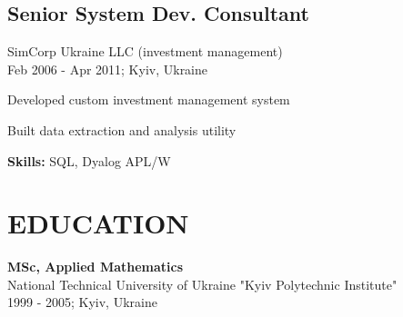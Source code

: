 \documentclass[a4paper,10pt]{article}
\begin{document}
\subsection*{Senior System Dev. Consultant}
SimCorp Ukraine LLC (investment management) \\
Feb 2006 - Apr 2011; Kyiv, Ukraine
\begin{bulletlist}
    \item Developed custom investment management system
    \item Built data extraction and analysis utility
\end{bulletlist}
\textbf{Skills:} SQL, Dyalog APL/W

\section*{EDUCATION}
\textbf{MSc, Applied Mathematics} \\
National Technical University of Ukraine "Kyiv Polytechnic Institute" \\
1999 - 2005; Kyiv, Ukraine
\end{document}
